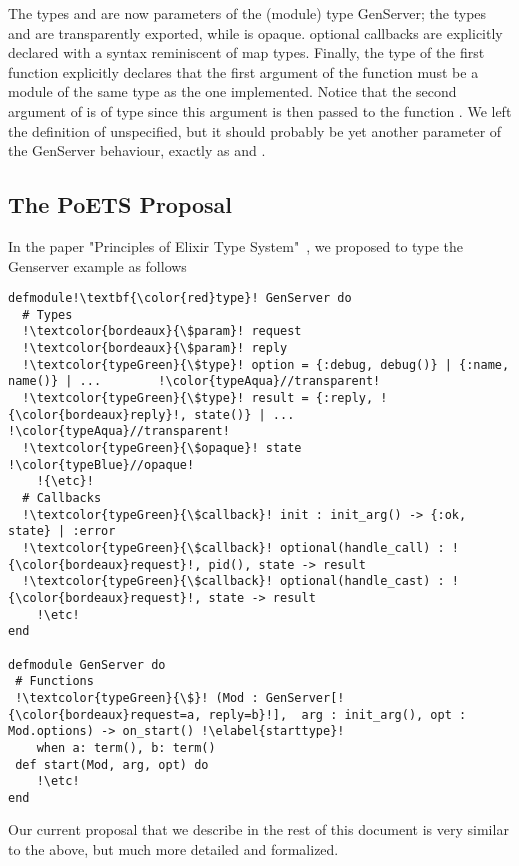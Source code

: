 \documentclass[a4paper,10pt]{article}
\begin{document}
The types  and  are now parameters of the (module) type GenServer; the types  and  are transparently exported, while  is opaque. optional callbacks are explicitly declared with a syntax reminiscent of map types. Finally, the type of the  first  function explicitly declares that the first argument of the  function must be a module of the same type as the one implemented. Notice that the second argument of  is of type  since this argument is then passed to the function . We left the definition of  unspecified, but it should probably be yet another parameter of the GenServer behaviour, exactly as   and .  



\subsection{The PoETS Proposal}
In the paper "Principles of Elixir Type System"~\cite{CDV24}, we proposed to type the Genserver example as follows

\begin{verbatim}
defmodule!\textbf{\color{red}type}! GenServer do
  # Types
  !\textcolor{bordeaux}{\$param}! request
  !\textcolor{bordeaux}{\$param}! reply
  !\textcolor{typeGreen}{\$type}! option = {:debug, debug()} | {:name, name()} | ...        !\color{typeAqua}//transparent!
  !\textcolor{typeGreen}{\$type}! result = {:reply, !{\color{bordeaux}reply}!, state()} | ...                   !\color{typeAqua}//transparent!
  !\textcolor{typeGreen}{\$opaque}! state                                                   !\color{typeBlue}//opaque!
    !{\etc}!
  # Callbacks
  !\textcolor{typeGreen}{\$callback}! init : init_arg() -> {:ok, state} | :error      
  !\textcolor{typeGreen}{\$callback}! optional(handle_call) : !{\color{bordeaux}request}!, pid(), state -> result
  !\textcolor{typeGreen}{\$callback}! optional(handle_cast) : !{\color{bordeaux}request}!, state -> result        
    !\etc!
end

defmodule GenServer do
 # Functions
 !\textcolor{typeGreen}{\$}! (Mod : GenServer[!{\color{bordeaux}request=a, reply=b}!],  arg : init_arg(), opt : Mod.options) -> on_start() !\elabel{starttype}!
    when a: term(), b: term()
 def start(Mod, arg, opt) do
    !\etc!
end
\end{verbatim}
Our current proposal that we describe in the rest of this document is very similar to the above, but much more detailed and formalized.
\end{document}
